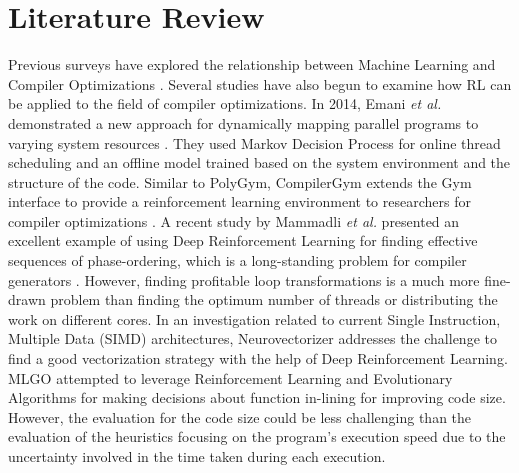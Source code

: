 \documentclass[logo,msc]{infthesis}           %
\begin{document}
\section{Literature Review}

Previous surveys have explored the relationship between Machine Learning and Compiler Optimizations \cite{8357388}\cite{9232934}. Several studies have also begun to examine how RL can be applied to the field of compiler optimizations. In 2014, Emani \textit{et al.} demonstrated a new approach for dynamically mapping parallel programs to varying system resources \cite{10.1007}. They used Markov Decision Process for online thread scheduling and an offline model trained based on the system environment and the structure of the code. Similar to PolyGym, CompilerGym extends the Gym interface to provide a reinforcement learning environment to researchers for compiler optimizations \cite{CompilerGym}. A recent study by Mammadli \textit{et al.} presented an excellent example of using Deep Reinforcement Learning for finding effective sequences of phase-ordering, which is a long-standing problem for compiler generators \cite{static.neural}. However, finding profitable loop transformations is a much more fine-drawn problem than finding the optimum number of threads or distributing the work on different cores. In an investigation related to current Single Instruction, Multiple Data (SIMD) architectures, Neurovectorizer \cite{NeuroVectorizer} addresses the challenge to find a good vectorization strategy with the help of Deep Reinforcement Learning. MLGO \cite{10.48550} attempted to leverage Reinforcement Learning and Evolutionary Algorithms for making decisions about function in-lining for improving code size. However, the evaluation for the code size could be less challenging than the evaluation of the heuristics focusing on the program's execution speed due to the uncertainty involved in the time taken during each execution.
\end{document}
